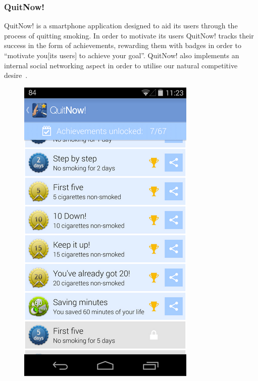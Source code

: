 \documentclass[a4paper,12pt]{article}
\begin{document}
\subsubsection{QuitNow!}
QuitNow! is a smartphone application designed to aid its users through the process of quitting smoking.
In order to motivate its users QuitNow! tracks their success in the form of achievements, rewarding them with badges in order to ``motivate you[its users] to achieve your goal''\citep{quitnow}. 
QuitNow! also implements an internal social networking aspect in order to utilise our natural competitive desire~\citep{bread-and-games}.\\

\begin{figure}[!ht]
\centering
\begin{minipage}{.5\textwidth}
  \centering
  \includegraphics[width=.6\linewidth]{./images/application-quitnow-achievements}
  \label{application-quitnow-achievements}
\end{minipage}%
\begin{minipage}{.5\textwidth}
  \centering

\end{minipage}
\end{figure}
\end{document}
